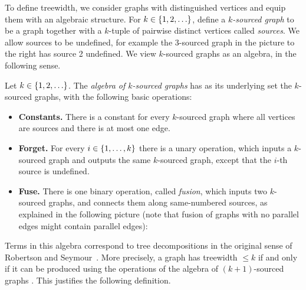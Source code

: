         
        
        \begin{wrapfigure}{r}{0.3\textwidth}
             \end{wrapfigure}  
To define treewidth, we consider graphs with distinguished vertices and equip them with an algebraic structure.  
    For $k \in \{1,2,\ldots\}$,  define a \emph{$k$-sourced graph}
     to be a  graph together with a $k$-tuple of pairwise distinct vertices called \emph{sources}. We allow sources to be undefined, for example the 3-sourced graph in the picture to the right has source 2 undefined.
    We view  $k$-sourced graphs as an algebra, in the following sense.



    
    \begin{definition}
         Let $k \in \{1,2,\ldots\}$. The \emph{algebra of $k$-sourced graphs} has as its underlying set the  $k$-sourced graphs,  with the following basic operations:
            \begin{itemize}
                \item {\bf Constants.} There is a constant for every $k$-sourced graph where all vertices are sources and there is at most one edge.
                \item {\bf Forget.} For every $i \in \{1,\ldots,k\}$ there is a unary operation, which inputs a $k$-sourced graph and outputs the same $k$-sourced graph, except that the $i$-th source is undefined. 
                \item {\bf Fuse.} There is one binary operation, called \emph{fusion}, which inputs two $k$-sourced graphs, and 
                connects %
                them along same-numbered sources, 
                as explained in the following picture (note that fusion of graphs with no parallel edges might contain parallel edges):
            \end{itemize}
        \end{definition}
    
        Terms in this algebra correspond to tree decompositions in the original sense of Robertson and Seymour~\cite[Section 12.3]{diestel}. More precisely, a graph has treewidth $\leq k$  if and only if it can be produced using the operations of the algebra of $(k+1)$-sourced graphs \cite[Proposition 4.1]{courcelleEtAlAlgebraicTheoryOfGraphReduction93}. This justifies the following definition.


